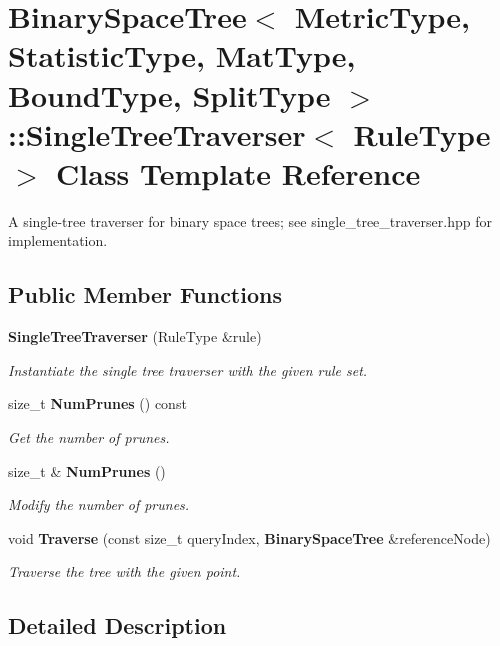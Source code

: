 \section{Binary\+Space\+Tree$<$ Metric\+Type, Statistic\+Type, Mat\+Type, Bound\+Type, Split\+Type $>$\+:\+:Single\+Tree\+Traverser$<$ Rule\+Type $>$ Class Template Reference}
\label{classmlpack_1_1tree_1_1BinarySpaceTree_1_1SingleTreeTraverser}


A single-\/tree traverser for binary space trees; see single\+\_\+tree\+\_\+traverser.\+hpp for implementation.  


\subsection*{Public Member Functions}
\begin{DoxyCompactItemize}
\item 
\textbf{ Single\+Tree\+Traverser} (Rule\+Type \&rule)
\begin{DoxyCompactList}\small\item\em Instantiate the single tree traverser with the given rule set. \end{DoxyCompactList}\item 
size\+\_\+t \textbf{ Num\+Prunes} () const
\begin{DoxyCompactList}\small\item\em Get the number of prunes. \end{DoxyCompactList}\item 
size\+\_\+t \& \textbf{ Num\+Prunes} ()
\begin{DoxyCompactList}\small\item\em Modify the number of prunes. \end{DoxyCompactList}\item 
void \textbf{ Traverse} (const size\+\_\+t query\+Index, \textbf{ Binary\+Space\+Tree} \&reference\+Node)
\begin{DoxyCompactList}\small\item\em Traverse the tree with the given point. \end{DoxyCompactList}\end{DoxyCompactItemize}


\subsection{Detailed Description}
